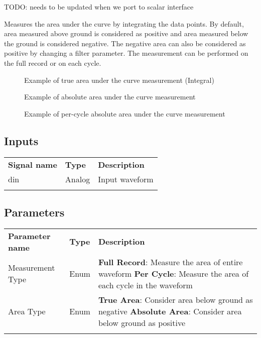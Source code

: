 TODO: needs to be updated when we port to scalar interface

Measures the area under the curve by integrating the data points. By default, area measured above ground is considered
as positive and area measured below the ground is considered negative. The negative area can also be considered as positive
by changing a filter parameter. The measurement can be performed on the full record or on each cycle.

\begin{figure}[h]
\centering
{}
\caption{Example of true area under the curve measurement (Integral)}
\end{figure}

\begin{figure}[h]
\centering
{}
\caption{Example of absolute area under the curve measurement}
\end{figure}

\pagebreak

\begin{figure}[h]
\centering
{}
\caption{Example of per-cycle absolute area under the curve measurement}
\end{figure}

\subsection{Inputs}

\begin{tabularx}{16cm}{llX}
\thickhline
\textbf{Signal name} & \textbf{Type} & \textbf{Description} \\
\thickhline
din & Analog & Input waveform \\
\thickhline
\end{tabularx}

\subsection{Parameters}

\begin{tabularx}{16cm}{llX}
\thickhline
\textbf{Parameter name} & \textbf{Type} & \textbf{Description} \\
\thickhline
Measurement Type & Enum &
	\textbf{Full Record}: Measure the area of entire waveform \newline
	\textbf{Per Cycle}: Measure the area of each cycle in the waveform\\
\thinhline
Area Type & Enum &
	\textbf{True Area}: Consider area below ground as negative\newline
	\textbf{Absolute Area}: Consider area below ground as positive\\
\thickhline
\end{tabularx}


